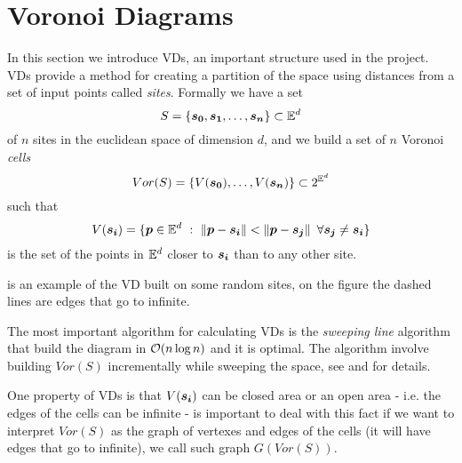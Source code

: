 \documentclass[dissertation.tex]{subfiles}
\begin{document}
\section{Voronoi Diagrams}\label{sec:voronoi}
In this section we introduce \acfp{VD}, an important structure used in
the project. \acp{VD} \cite{deberg} provide a method for creating a
partition of the
space using distances from a set of input points called
\emph{sites}. Formally we have a set
\begin{equation*}
  S=\{\boldsymbol{s_0},\boldsymbol{s_1},\dots,\boldsymbol{s_n}\} \subset \mathbb{E}^d
\end{equation*}
of $n$ sites in the euclidean space of dimension $d$, and we build a
set of $n$ Voronoi \emph{cells}
\begin{equation*}
  Vor(S)=\{V(\boldsymbol{s_0}),\dots,V(\boldsymbol{s_n})\}\subset 2^{\mathbb{E}^d}
\end{equation*}
such that
\begin{equation*}
  V(\boldsymbol{\boldsymbol{s_i}})=\{\boldsymbol{p}\in\mathbb{E}^d\ :\
  \left\lVert\boldsymbol{p}-\boldsymbol{s_i}\right\rVert<\left\lVert\boldsymbol{p}-\boldsymbol{s_j}\right\rVert\ \forall \boldsymbol{s_j}\neq\boldsymbol{s_i}\}
\end{equation*}
is the set of the points in $\mathbb{E}^d$ closer to $\boldsymbol{s_i}$ than to any
other site.

\Cref{fig:voronoi} is an example of the \ac{VD} built on some random
sites, on the figure the dashed lines are edges that go to infinite.

The most important algorithm for calculating \acp{VD} is the
\emph{sweeping line} algorithm that build the diagram in $\mathcal{O}(n\log
n)$ and it is optimal. The algorithm involve building $Vor(S)$
incrementally while sweeping the space, see \cite{deberg} and
\cite{fortune} for
details.

One property of \acp{VD} is that $V(\boldsymbol{s_i})$ can be closed area or an
open area - i.e. the edges of the cells can be infinite - is important
to deal with this fact if we want to interpret $Vor(S)$ as the graph of
vertexes and edges of the cells (it will have edges that go to
infinite), we call such graph $G(Vor(S))$.
\end{document}

